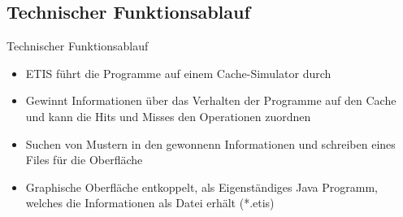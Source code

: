 \subsection{Technischer Funktionsablauf}
\begin{frame}
\begin{block}{Technischer Funktionsablauf}
\begin{itemize}[<+->]
\pause\item ETIS führt die Programme auf einem Cache-Simulator durch
\item Gewinnt Informationen über das Verhalten der Programme auf den Cache und kann die Hits und Misses den Operationen zuordnen
\item Suchen von Mustern in den gewonnenn Informationen und schreiben eines Files für die Oberfläche
\item Graphische Oberfläche entkoppelt, als Eigenständiges Java Programm, welches die Informationen als Datei erhält (*.etis)
\end{itemize}
\end{block}
\end{frame}

